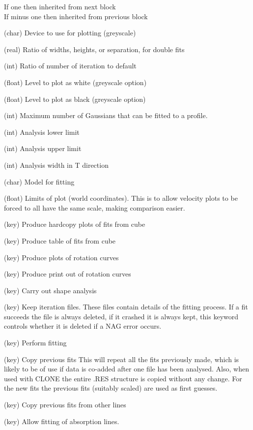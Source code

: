 \begin{description}
If one then inherited from next block\\
If minus one then inherited from previous block
\item[DEvice] (char) Device to use for plotting (greyscale)
\item[FITRat] (real) Ratio of widths, heights, or separation, for
double fits
\item[CAlrat] (int) Ratio of number of iteration to default
\item[WHite] (float) Level to plot as white (greyscale option)
\item[BLack] (float) Level to plot as black (greyscale option)
\item[MAXGauss] (int) Maximum number of Gaussians that can be fitted
to a profile.
\item[TStart] (int) Analysis lower limit
\item[TEnd] (int) Analysis upper limit
\item[TBlock] (int) Analysis width in T direction
\item[FIT\_MODEL] (char) Model for fitting
\item[PLOTLim] (float) Limits of plot (world coordinates).
This is to allow velocity plots to be forced to all have the same scale,
making comparison easier.
\item[HArdcopy] (key) Produce hardcopy plots of fits from cube
\item[TAble] (key) Produce table of fits from cube
\item[PLOT] (key) Produce plots of rotation curves
\item[PRInt] (key) Produce print out of rotation curves
\item[SHape] (key) Carry out shape analysis
\item[KEEP\_ITT] (key) Keep iteration files. These files contain
details of the fitting process. If a fit succeeds the file is always
deleted, if it crashed it is always kept, this keyword controls
whether it is deleted if a NAG error occurs.
\item[FIT] (key) Perform fitting
\item[COPY] (key) Copy previous fits This will repeat all the fits
previously made, which is likely to be of use if data is co-added after
one file has been analysed. Also, when used with CLONE the entire .RES
structure is copied without any change. For the new fits the previous
fits (suitably scaled) are used as first guesses.
\item[TRansfer] (key) Copy previous fits from other lines
\item[ABsorption] (key) Allow fitting of absorption lines.

\end{description}
